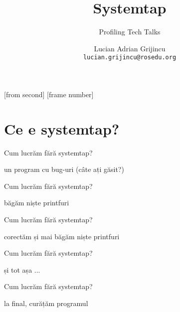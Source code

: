 \documentclass{beamer}
\title[Systemtap]{Systemtap}
\subtitle{Profiling Tech Talks}
\institute{ROSEdu}
\author{Lucian Adrian Grijincu \\ \texttt{lucian.grijincu@rosedu.org}}
\begin{document}
[from second]
[frame number]

\frame{\titlepage}

\frame{\tableofcontents}

\section{Ce e systemtap?}

\frame{\tableofcontents[currentsection]}


\begin{frame}{Cum lucrăm fără systemtap?}
  \begin{beamerboxesrounded}[lower=block body,shadow=true]{un program cu bug-uri (câte ați găsit?)}
    \small 
  \end{beamerboxesrounded}
\end{frame}


\begin{frame}{Cum lucrăm fără systemtap?}
  \begin{beamerboxesrounded}[lower=block body,shadow=true]{băgăm niște printfuri}
    \small 
  \end{beamerboxesrounded}
\end{frame}

\begin{frame}{Cum lucrăm fără systemtap?}
  \begin{beamerboxesrounded}[lower=block body,shadow=true]{corectăm și mai băgăm niște printfuri}
    \small 
  \end{beamerboxesrounded}
\end{frame}

\begin{frame}{Cum lucrăm fără systemtap?}
  \begin{beamerboxesrounded}[lower=block body,shadow=true]{și tot așa ...}
    \small 
  \end{beamerboxesrounded}
\end{frame}

\begin{frame}{Cum lucrăm fără systemtap?}
  \begin{beamerboxesrounded}[lower=block body,shadow=true]{la final, curățăm programul}
    \small 
  \end{beamerboxesrounded}
\end{frame}
\end{document}
